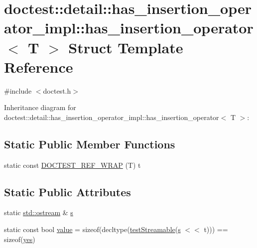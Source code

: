 \hypertarget{structdoctest_1_1detail_1_1has__insertion__operator__impl_1_1has__insertion__operator}{}\section{doctest\+:\+:detail\+:\+:has\+\_\+insertion\+\_\+operator\+\_\+impl\+:\+:has\+\_\+insertion\+\_\+operator$<$ T $>$ Struct Template Reference}
\label{structdoctest_1_1detail_1_1has__insertion__operator__impl_1_1has__insertion__operator}


{\ttfamily \#include $<$doctest.\+h$>$}



Inheritance diagram for doctest\+:\+:detail\+:\+:has\+\_\+insertion\+\_\+operator\+\_\+impl\+:\+:has\+\_\+insertion\+\_\+operator$<$ T $>$\+:
\subsection*{Static Public Member Functions}
\begin{DoxyCompactItemize}
\item 
static const \hyperlink{structdoctest_1_1detail_1_1has__insertion__operator__impl_1_1has__insertion__operator_a1fb02db021f0e6039e11df088f47ae4f}{D\+O\+C\+T\+E\+S\+T\+\_\+\+R\+E\+F\+\_\+\+W\+R\+AP} (T) t
\end{DoxyCompactItemize}
\subsection*{Static Public Attributes}
\begin{DoxyCompactItemize}
\item 
static \hyperlink{doctest_8h_a116af65cb5e924b33ad9d9ecd7a783f3}{std\+::ostream} \& \hyperlink{structdoctest_1_1detail_1_1has__insertion__operator__impl_1_1has__insertion__operator_abdd586daed17058bb6d08adc796802f0}{s}
\item 
static const bool \hyperlink{structdoctest_1_1detail_1_1has__insertion__operator__impl_1_1has__insertion__operator_a8e8e9abdead07386f3d1f16bbca64986}{value} = sizeof(decltype(\hyperlink{namespacedoctest_1_1detail_1_1has__insertion__operator__impl_a0d220c1c0845fcc4952ed6d45ac254aa}{test\+Streamable}(\hyperlink{structdoctest_1_1detail_1_1has__insertion__operator__impl_1_1has__insertion__operator_abdd586daed17058bb6d08adc796802f0}{s} $<$$<$ t))) == sizeof(\hyperlink{namespacedoctest_1_1detail_1_1has__insertion__operator__impl_a0351593f27f12bf077fd702f6fc26fb5}{yes})
\end{DoxyCompactItemize}


